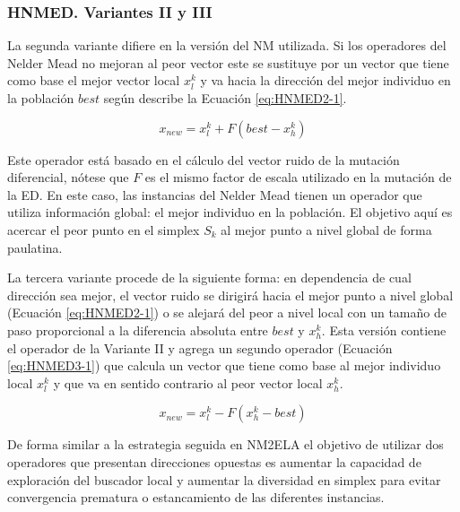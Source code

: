 \subsubsection{HNMED. Variantes II y III}
La segunda variante difiere en la versión del NM utilizada. Si los operadores del Nelder Mead no mejoran al peor vector este se sustituye por un vector que tiene como base el mejor vector local $x^k_l$ y va hacia la dirección del mejor individuo en la población $best$ según describe la Ecuación \ref{eq:HNMED2-1}.
\begin{center}
\begin{equation}\label{eq:HNMED2-1}
x_{new}= x^k_l+ F(best-x^k_h)
\end{equation}
\end{center}
Este operador está basado en el cálculo del vector ruido de la mutación diferencial, nótese que $F$ es el mismo factor de escala utilizado en la mutación de la ED. En este caso, las instancias del Nelder Mead tienen un operador que utiliza información global: el mejor individuo en la población. El objetivo aquí es acercar el peor punto en el simplex $S_k$ al mejor punto a nivel global de forma paulatina.

La tercera variante procede de la siguiente forma: en dependencia de cual dirección sea mejor, el vector ruido se dirigirá hacia el mejor punto a nivel global (Ecuación \ref{eq:HNMED2-1}) o se alejará del peor a nivel local con un tamaño de paso proporcional a la diferencia absoluta entre $best$ y $x^k_h$. Esta versión contiene el operador de la Variante II y agrega  un segundo operador (Ecuación \ref{eq:HNMED3-1}) que calcula un vector que tiene como base al mejor individuo local $x^k_l$ y que va en sentido contrario al peor vector local $x^k_h$.
\begin{center}
\begin{equation}\label{eq:HNMED3-1}
x_{new}= x^k_l- F(x^k_h-best)
\end{equation}
\end{center}
De forma similar a la estrategia seguida en NM2ELA el objetivo de utilizar dos operadores que presentan direcciones opuestas es aumentar la capacidad de exploración del buscador local y aumentar la diversidad en simplex para evitar convergencia prematura o estancamiento de las diferentes instancias.

